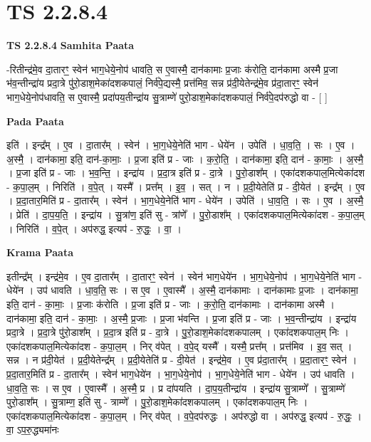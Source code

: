 \documentclass[17pt]{extarticle}
\begin{document}
\section*{ TS 2.2.8.4 }

\textbf{TS 2.2.8.4 } \newline
\textbf{Samhita Paata} \newline

-रितीन्द्र॑मे॒व दा॒तारꣳ॒॒ स्वेन॑ भाग॒धेये॒नोप॑ धावति॒ स ए॒वास्मै॒ दान॑कामाः प्र॒जाः क॑रोति॒ दान॑कामा अस्मै प्र॒जा भ॑व॒न्तीन्द्रा॑य प्रदा॒त्रे पु॑रो॒डाश॒मेका॑दशकपालं॒ निर्व॑पे॒द्यस्मै॒ प्रत्त॑मिव॒ सन्न प्र॑दी॒येतेन्द्र॑मे॒व प्र॑दा॒तारꣳ॒॒ स्वेन॑ भाग॒धेये॒नोप॑धावति॒ स ए॒वास्मै॒ प्रदा॑पय॒तीन्द्रा॑य सु॒त्राम्णे॑ पुरो॒डाश॒मेका॑दशकपालं॒ निर्व॑पे॒दप॑रुद्धो वा - [  ] \newline

\textbf{Pada Paata} \newline

इति॑ । इन्द्र᳚म् । ए॒व । दा॒तार᳚म् । स्वेन॑ । भा॒ग॒धेये॒नेति॑ भाग - धेये॑न । उपेति॑ । धा॒व॒ति॒ । सः । ए॒व । अ॒स्मै॒ । दान॑कामा॒ इति॒ दान॑-का॒माः॒ । प्र॒जा इति॑ प्र - जाः । क॒रो॒ति॒ । दान॑कामा॒ इति॒ दान॑ - का॒माः॒ । अ॒स्मै॒ । प्र॒जा इति॑ प्र - जाः । भ॒व॒न्ति॒ । इन्द्रा॑य । प्र॒दा॒त्र इति॑ प्र - दा॒त्रे । पु॒रो॒डाश᳚म् । एका॑दशकपाल॒मित्येका॑दश - क॒पा॒ल॒म् । निरिति॑ । व॒पे॒त् । यस्मै᳚ । प्रत्त᳚म् । इ॒व॒ । सत् । न । प्र॒दी॒येतेति॑ प्र - दी॒येत॑ । इन्द्र᳚म् । ए॒व । प्र॒दा॒तार॒मिति॑ प्र - दा॒तार᳚म् । स्वेन॑ । भा॒ग॒धेये॒नेति॑ भाग - धेये॑न । उपेति॑ । धा॒व॒ति॒ । सः । ए॒व । अ॒स्मै॒ । प्रेति॑ । दा॒प॒य॒ति॒ । इन्द्रा॑य । सु॒त्रांण॒ इति॑ सु - त्रांणे᳚ । पु॒रो॒डाश᳚म् । एका॑दशकपाल॒मित्येका॑दश - क॒पा॒ल॒म् । निरिति॑ । व॒पे॒त् । अप॑रुद्ध॒ इत्यप॑ - रु॒द्धः॒ । वा॒ ।  \newline


\textbf{Krama Paata} \newline

इतीन्द्र᳚म् । इन्द्र॑मे॒व । ए॒व दा॒तार᳚म् । दा॒तारꣳ॒॒ स्वेन॑ । स्वेन॑ भाग॒धेये॑न । भा॒ग॒धेये॒नोप॑ । भा॒ग॒धेये॒नेति॑ भाग - धेये॑न । उप॑ धावति । धा॒व॒ति॒ सः । स ए॒व । ए॒वास्मै᳚ । अ॒स्मै॒ दान॑कामाः । दान॑कामाः प्र॒जाः । दान॑कामा॒ इति॒ दान॑ - का॒माः॒ । प्र॒जाः क॑रोति । प्र॒जा इति॑ प्र - जाः । क॒रो॒ति॒ दान॑कामाः । दान॑कामा अस्मै । दान॑कामा॒ इति॒ दान॑ - का॒माः॒ । अ॒स्मै॒ प्र॒जाः । प्र॒जा भ॑वन्ति । प्र॒जा इति॑ प्र - जाः । भ॒व॒न्तीन्द्रा॑य । इन्द्रा॑य प्रदा॒त्रे । प्र॒दा॒त्रे पु॑रो॒डाश᳚म् । प्र॒दा॒त्र इति॑ प्र - दा॒त्रे । पु॒रो॒डाश॒मेका॑दशकपालम् । एका॑दशकपाल॒म् निः । एका॑दशकपाल॒मित्येका॑दश - क॒पा॒ल॒म् । निर् व॑पेत् । व॒पे॒द् यस्मै᳚ । यस्मै॒ प्रत्त᳚म् । प्रत्त॑मिव । इ॒व॒ सत् । सन्न । न प्र॑दी॒येत॑ । प्र॒दी॒येतेन्द्र᳚म् । प्र॒दी॒येतेति॑ प्र - दी॒येत॑ । इन्द्र॑मे॒व । ए॒व प्र॑दा॒तार᳚म् । प्र॒दा॒तारꣳ॒॒ स्वेन॑ । प्र॒दा॒तार॒मिति॑ प्र - दा॒तार᳚म् । स्वेन॑ भाग॒धेये॑न । भा॒ग॒धेये॒नोप॑ । भा॒ग॒धेये॒नेति॑ भाग - धेये॑न । उप॑ धावति । धा॒व॒ति॒ सः । स ए॒व । ए॒वास्मै᳚ । अ॒स्मै॒ प्र । प्र दा॑पयति । दा॒प॒य॒तीन्द्रा॑य । इन्द्रा॑य सु॒त्राम्णे᳚ । सु॒त्राम्णे॑ पुरो॒डाश᳚म् । सु॒त्राम्ण॒ इति॑ सु - त्राम्णे᳚ । पु॒रो॒डाश॒मेका॑दशकपालम् । एका॑दशकपाल॒म् निः । एका॑दशकपाल॒मित्येका॑दश - क॒पा॒ल॒म् । निर् व॑पेत् । व॒पे॒दप॑रुद्धः । अप॑रुद्धो वा । अप॑रुद्ध॒ इत्यप॑ - रु॒द्धः॒ । 
वा॒ ऽप॒रु॒द्ध्यमा॑नः \newline
\end{document}
